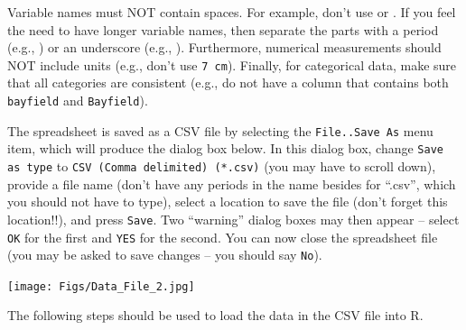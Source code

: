 \documentclass[10pt,openany]{book}\usepackage[]{graphicx}\usepackage[]{color}
\begin{document}
\vspace{-12pt}

\vspace{-12pt}

Variable names must NOT contain spaces.  For example, don't use  or .  If you feel the need to have longer variable names, then separate the parts with a period (e.g., ) or an underscore (e.g., ).  Furthermore, numerical measurements should NOT include units (e.g., don't use \verb"7 cm").  Finally, for categorical data, make sure that all categories are consistent (e.g., do not have a column that contains both \verb"bayfield" and \verb"Bayfield").


The spreadsheet is saved as a CSV file by selecting the \verb"File..Save As" menu item, which will produce the dialog box below. In this dialog box, change \verb"Save as type" to \verb"CSV (Comma delimited) (*.csv)" (you may have to scroll down), provide a file name (don't have any periods in the name besides for ``.csv'', which you should not have to type), select a location to save the file (don't forget this location!!), and press \verb"Save".  Two ``warning'' dialog boxes may then appear -- select \verb"OK" for the first and \verb"YES" for the second.  You can now close the spreadsheet file (you may be asked to save changes -- you should say \verb"No").
\begin{center}
  \texttt{[image: Figs/Data\_File\_2.jpg]}
\end{center}

The following steps should be used to load the data in the CSV file into R.
\end{document}
